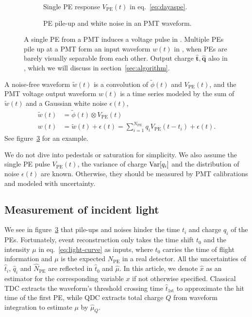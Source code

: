 \begin{figure}[H]
  \begin{subfigure}{.49\textwidth}
    \centering
    \resizebox{\textwidth}{!}{}
    \caption{\label{fig:spe} Single PE response $V_\mathrm{PE}(t)$ in eq.~\eqref{eq:dayaspe}.}
  \end{subfigure}
  \begin{subfigure}{.49\textwidth}
    \centering
    \resizebox{\textwidth}{!}{}
    \caption{\label{fig:pile} PE pile-up and white noise in an PMT waveform.}
  \end{subfigure}
  \caption{A single PE from a PMT induces a voltage pulse in . Multiple PEs pile up at a PMT form an input waveform $w(t)$ in , when PEs are barely visually separable from each other. Output charge $\hat{\bm{t}}, \hat{\bm{q}}$ also in , which we will discuss in section~\ref{sec:algorithm}. }
\end{figure}

A noise-free waveform $\tilde{w}(t)$ is a convolution of $\tilde{\phi}(t)$ and $V_\mathrm{PE}(t)$, and the PMT voltage output waveform $w(t)$ is a time series modeled by the sum of $\tilde{w}(t)$ and a Gaussian white noise $\epsilon(t)$,
\begin{equation}
  \label{eq:1}
  \begin{aligned}
    \tilde{w}(t) &= \tilde{\phi}(t) \otimes V_\mathrm{PE}(t) \\
    w(t) &= \tilde{w}(t) + \epsilon(t) = \sum_{i=1}^{N_\mathrm{PE}} q_i V_\mathrm{PE}(t-t_i) + \epsilon(t).
  \end{aligned}
\end{equation}
See figure~\ref{fig:pile} for an example.

We do not dive into pedestals or saturation for simplicity.  We also assume the single PE pulse $V_\mathrm{PE}(t)$, the variance of charge $\operatorname{Var}[q_i]$ and the distribution of noise $\epsilon(t)$ are known.  Otherwise, they should be measured by PMT calibrations and modeled with uncertainty.


\subsection{Measurement of incident light}
\label{sec:time}
We see in figure~\ref{fig:pile} that pile-ups and noises hinder the time $t_i$ and charge $q_i$ of the PEs. Fortunately, event reconstruction only takes the time shift $t_0$ and the intensity $\mu$ in eq.~\eqref{eq:light-curve} as inputs, where $t_0$ carries the time of flight information and $\mu$ is the expected $N_\mathrm{PE}$ in a real detector.  All the uncertainties of $\hat{t}_i$, $\hat{q}_i$ and $\hat{N}_\mathrm{PE}$ are reflected in $\hat{t}_0$ and $\hat{\mu}$. In this article, we denote $\hat{x}$ as an estimator for the corresponding variable $x$ if not otherwise specified.  Classical TDC extracts the waveform's threshold crossing time $\hat{t}_\mathrm{1st}$ to approximate the hit time of the first PE, while QDC extracts total charge $Q$ from waveform integration to estimate $\mu$ by $\hat{\mu}_Q$.

